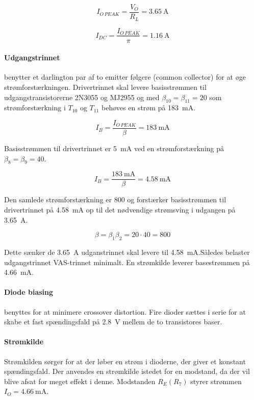 \documentclass[danish]{article}
\begin{document}
\begin{equation}
I_{O\,PEAK} = \dfrac{V_O}{R_L} = \SI{3.65}{\ampere}
\end{equation}

\begin{equation}
I_{DC} = \dfrac{I_{O\,PEAK}}{\pi} = \SI{1.16}{\ampere}
\end{equation}

\paragraph{Udgangstrinnet} benytter et darlington par af to emitter følgere (common collector) for at øge strømforstærkningen. Drivertrinnet skal levere basisstrømmen til udgangstransistorerne 2N3055 og MJ2955 og med $\beta_{10} = \beta_{11} = 20$ som strømforstærkning i $T_{10}$ og $T_{11}$ behøves en strøm på \SI{183}{\milli\ampere}.

\begin{equation}
I_B = \dfrac{I_{O\,PEAK}}{\beta} = \SI{183}{\milli\ampere}
\end{equation}

Basisstrømmen til drivertrinnet er \SI{5}{\milli\ampere} ved en strømforstærkning på $\beta_8 = \beta_9 = 40$.

\begin{equation}
I_B = \dfrac{\SI{183}{\milli\ampere}}{\beta} = \SI{4.58}{\milli\ampere}
\end{equation}

Den samlede strømforstærkning er 800 og forstærker basisstrømmen til drivertrinnet på \SI{4.58}{\milli\ampere} op til det nødvendige strømsving i udgangen på \SI{3.65}{\ampere}.

\begin{equation}
\beta = \beta_1 \beta_2 = 20 {\cdot} 40 = 800
\end{equation}

Dette sænker de \SI{3.65}{\ampere} udganstrinnet skal levere til \SI{4.58}{\milli\ampere}.Således belaster udgangstrinnet VAS-trinnet minimalt.
En strømkilde leverer basestrømmen på \SI{4.66}{\milli\ampere}.


\paragraph{Diode biasing} benyttes for at minimere crossover distortion. Fire dioder sættes i serie for at skabe et fast spændingsfald på \SI{2.8}{\volt} mellem de to transistores baser. 

\paragraph{Strømkilde}
Strømkilden sørger for at der løber en strøm i dioderne, der giver et konstant spændingsfald. Der anvendes en strømkilde istedet for en modstand, da der vil blive afsat for meget effekt i denne.
Modstanden $R_E (R_{7})$ styrer strømmen $I_O = \SI{4.66}{\milli\ampere}$. 
\end{document}
